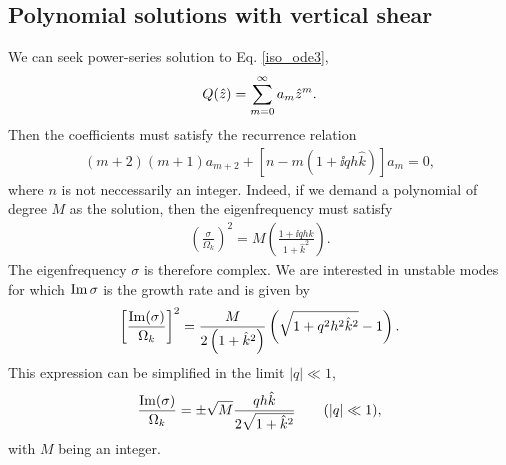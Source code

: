 \subsection{Polynomial solutions with vertical shear}
We can seek power-series solution to Eq. \ref{iso_ode3},
\begin{align}
  Q(\hat{z}) = \sum_{m=0}^\infty a_m\hat{z}^m. 
\end{align}
Then the coefficients must satisfy the recurrence relation
\begin{align}
  (m+2)(m+1)a_{m+2} +
  \left[n - m\left(1+\ii q h \hat{k}\right)\right] a_m = 0, 
\end{align}
where $n$ is not neccessarily an integer. Indeed, if we demand
a polynomial of degree $M$ as the solution, then the eigenfrequency
must satisfy
\begin{align}
\left(\frac{\sigma}{\Omega_k}\right)^2 = M\left(\frac{1+\ii q h
    \hat{k}}{1+\hat{k}^2}\right).
\end{align}
The eigenfrequency $\sigma$ is therefore complex. We are interested in
unstable modes for which $\operatorname{Im}{\sigma}$ is the growth rate and is
given by 
\begin{align}
   \left[\frac{\operatorname{Im}(\sigma)}{\Omega_k}\right]^2 =
   \frac{M}{2\left(1+\hat{k}^2\right)}\left(\sqrt{1+q^2h^2\hat{k}^2} - 
    1\right). 
\end{align}
This expression can be simplified in the limit $|q|\ll 1$, 
 \begin{align}\label{simple_growth}
   \frac{\operatorname{Im}(\sigma)}{\Omega_k} = \pm \sqrt{M} 
   \frac{qh\hat{k}}{2\sqrt{1+\hat{k}^2}} \quad\quad (|q|\ll 1), 
 \end{align}
 with $M$ being an integer. 

